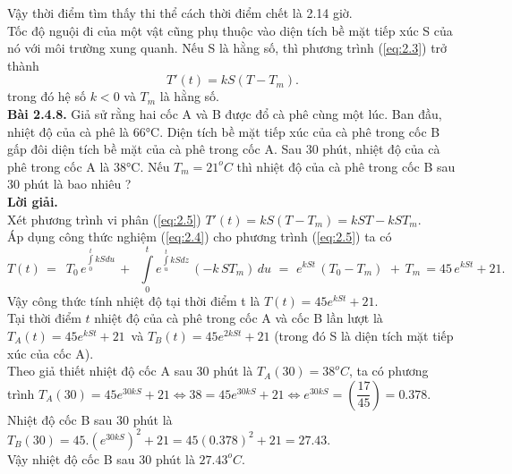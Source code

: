 Vậy thời điểm tìm thấy thi thể cách thời điểm chết là 2.14 giờ.\\
Tốc độ nguội đi của một vật cũng phụ thuộc vào diện tích bề mặt tiếp xúc S của nó với môi trường xung quanh. Nếu S là hằng số, thì phương trình (\ref{eq:2.3}) trở thành        
\begin{equation}
	T'(t)=kS\left( T-{{T}_{m}} \right).
	\label{eq:2.5}
\end{equation}
trong đó hệ số $k<0$ và $T_m$ là hằng số.\\
\textbf{Bài 2.4.8.} Giả sử rằng hai cốc A và B được đổ cà phê cùng một lúc. Ban đầu, nhiệt độ của cà phê là 66°C. Diện tích bề mặt tiếp xúc của cà phê trong cốc B gấp đôi diện tích bề mặt của cà phê trong cốc A. Sau 30 phút, nhiệt độ của cà phê trong cốc A là 38°C. Nếu ${{T}_{m}}={{21}^{o}}C$ thì nhiệt độ của cà phê trong cốc B sau 30 phút là bao nhiêu ?\\
\textbf{Lời giải.  }\\
Xét phương trình vi phân (\ref{eq:2.5}) $T'(t)=kS\left( T-{{T}_{m}} \right)=kST-kS{{T}_{m}}$.\\
Áp dụng công thức nghiệm (\ref{eq:2.4}) cho phương trình (\ref{eq:2.5}) ta có 
\[T(t)\,=\,\,\,{{T}_{0}}\,{{e}^{\int\limits_{0}^{t}{kSdu}}}\,+\,\,\,\int\limits_{0}^{t}{{{e}^{\int\limits_{u}^{t}{kSdz}}}}\,(-k\,S{{T}_{m}})\,du\,\,=\,\,{{e}^{kSt}}\,({{T}_{0}}-{{T}_{m}})\,\,+\,{{T}_{m}}\,=45\,{{e}^{kSt}}+21.\]
Vậy công thức tính nhiệt độ tại thời điểm t là $T(t)=45{{e}^{kSt}}+21$.\\
Tại thời điểm $t$ nhiệt độ của cà phê trong cốc A và cốc B lần lượt là ${{T}_{A}}(t)=45{{e}^{kSt}}+21\,$ và ${{T}_{B}}(t)=45{{e}^{2kSt}}+21$ (trong đó S là diện tích mặt tiếp xúc của cốc A).\\
Theo giả thiết nhiệt độ cốc A sau $30$ phút là ${{T}_{A}}(30)={{38}^{o}}C$, ta có phương trình
${{T}_{A}}(30)=45{{e}^{30kS}}+21\Leftrightarrow 38=45{{e}^{30kS}}+21\Leftrightarrow {{e}^{30kS}}=\left( \dfrac{17}{45} \right)=0.378.$\\
Nhiệt độ cốc B sau $30$ phút là  ${{T}_{B}}(30)=45.{{({{e}^{30kS}})}^{2}}+21=45{{(0.378)}^{2}}+21=27.43.$ \\
Vậy nhiệt độ cốc B sau $30$ phút là ${{27.43}^{o}}C$. 

